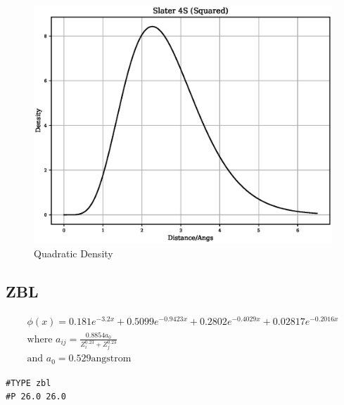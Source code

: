 \documentclass[12pt,twoside]{manual}
\begin{document}
\begin{appendices}
\FloatBarrier
\begin{figure}[h]
  \begin{center}
    \includegraphics[scale=0.5]{img/plots/slater_4s.eps}
    \caption{Quadratic Density}
    \label{graph:graph1}
  \end{center}
\end{figure}
\FloatBarrier







\subsection{ZBL}

\begin{equation}
\begin{split}
\phi(x) = 0.181 e^{-3.2x} + 0.5099 e^{-0.9423x} + 0.2802 e^{-0.4029x} + 0.02817 e^{-0.2016x} \\
\text{where } a_{ij} = \frac{0.8854 a_0}{Z^{0.23}_i + Z^{0.23}_j} \\
\text{and } a_0 = 0.529 \text{angstrom}
\end{split}
\label{eq:ZBL}
\end{equation}

\begin{lstlisting}[style=pseudocode,caption={ZBL}]
#TYPE zbl
#P 26.0 26.0
\end{lstlisting}


\end{appendices}
\end{document}
